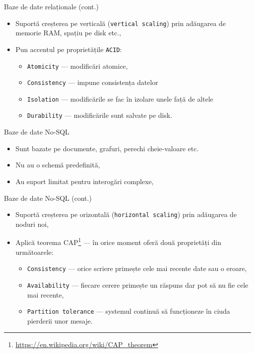 \documentclass[presentation]{beamer}
\begin{document}
\begin{frame}[label={sec:org67dd947},fragile]{Baze de date relaționale (cont.)}
 \begin{itemize}
\item Suportă creșterea pe verticală (\texttt{vertical scaling}) prin adăugarea de memorie RAM, spațiu pe disk etc.,
\item Pun accentul pe proprietățile \texttt{ACID}:
\begin{itemize}
\item \texttt{Atomicity} --- modificări atomice,
\item \texttt{Consistency} --- impune consistența datelor
\item \texttt{Isolation} --- modificările se fac în izolare unele față de altele
\item \texttt{Durability} --- modificările sunt salvate pe disk.
\end{itemize}
\end{itemize}
\end{frame}
\begin{frame}[label={sec:org3b17f9d}]{Baze de date No-SQL}
\begin{itemize}
\item Sunt bazate pe documente, grafuri, perechi cheie-valoare etc.
\item \alert{Nu} au o schemă predefinită,
\item Au suport limitat pentru interogări complexe,
\end{itemize}
\end{frame}
\begin{frame}[label={sec:org97ef92f},fragile]{Baze de date No-SQL (cont.)}
 \begin{itemize}
\item Suportă creșterea pe orizontală (\texttt{horizontal scaling}) prin adăugarea de noduri noi,
\item Aplică teorema CAP\footnote{\url{https://en.wikipedia.org/wiki/CAP\_theorem}} --- în orice moment oferă două proprietăți din următoarele:
\begin{itemize}
\item \texttt{Consistency} --- orice scriere primește cele mai recente date sau o eroare,
\item \texttt{Availability} --- fiecare cerere primește un răspuns dar pot să nu fie cele mai recente,
\item \texttt{Partition tolerance} --- systemul continuă să funcționeze în ciuda pierderii unor mesaje.
\end{itemize}
\end{itemize}
\end{frame}
\end{document}
